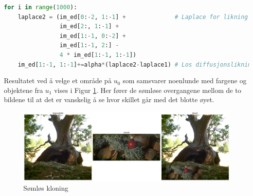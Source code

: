 \begin{lstlisting}[language=Python]
for i in range(1000):
    laplace2 = (im_ed[0:-2, 1:-1] +              # Laplace for likning 2
                im_ed[2:, 1:-1] +    
                im_ed[1:-1, 0:-2] +
                im_ed[1:-1, 2:] -
                4 * im_ed[1:-1, 1:-1])
    im_ed[1:-1, 1:-1]+=alpha*(laplace2-laplace1) # Los diffusjonslikningen
\end{lstlisting}
Resultatet ved å velge et område på $u_0$ som samsvarer noenlunde med fargene og objektene fra $u_1$ vises i Figur \ref{fig:seamless}. Her fører de sømløse overgangene mellom de to bildene til at det er vanskelig å se hvor skillet går med det blotte øyet. 
\begin{figure}[H]
\begin{center}
    \includegraphics[width=1\columnwidth]{bilder/Sømløs kloning/kloning.png}
    \caption{Sømløs kloning
    \label{fig:seamless}} 
\end{center}
\end{figure}

